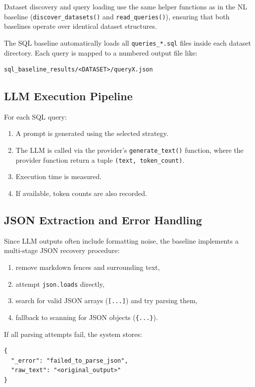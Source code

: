 \documentclass[12pt]{article}
\begin{document}
Dataset discovery and query loading use the same helper functions as in the NL baseline 
(\texttt{discover\_datasets()} and \texttt{read\_queries()}), ensuring that both baselines 
operate over identical dataset structures.

The SQL baseline automatically loads all \texttt{queries\_*.sql} files inside each dataset directory.  
Each query is mapped to a numbered output file like:

\begin{verbatim}
sql_baseline_results/<DATASET>/queryX.json
\end{verbatim}

\subsection{LLM Execution Pipeline}

For each SQL query:
\begin{enumerate}
    \item A prompt is generated using the selected strategy.
    \item The LLM is called via the provider's \verb|generate_text()| function, where the provider
          function return a tuple \verb|(text, token_count)|.
    \item Execution time is measured.
    \item If available, token counts are also recorded.
\end{enumerate}

\subsection{JSON Extraction and Error Handling}

Since LLM outputs often include formatting noise, the baseline implements a multi-stage JSON recovery procedure:

\begin{enumerate}
    \item remove markdown fences and surrounding text,
    \item attempt \verb|json.loads| directly,
    \item search for valid JSON arrays (\verb|[...]|) and try parsing them,
    \item fallback to scanning for JSON objects (\verb|{...}|).
\end{enumerate}

If all parsing attempts fail, the system stores:

\begin{verbatim}
{
  "_error": "failed_to_parse_json",
  "raw_text": "<original_output>"
}
\end{verbatim}
\end{document}
